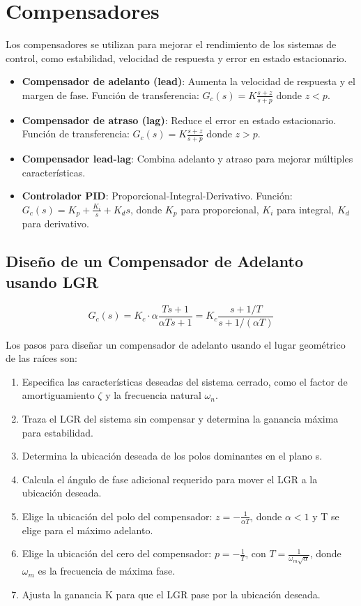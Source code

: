 \documentclass[legalpaper,twocolumn]{article}
\begin{document}
\section*{Compensadores}

Los compensadores se utilizan para mejorar el rendimiento de los sistemas de control, como estabilidad, velocidad de respuesta y error en estado estacionario.

\begin{itemize}
    \item \textbf{Compensador de adelanto (lead)}: Aumenta la velocidad de respuesta y el margen de fase. Función de transferencia: \( G_c(s) = K \frac{s + z}{s + p} \) donde \( z < p \).
    \item \textbf{Compensador de atraso (lag)}: Reduce el error en estado estacionario. Función de transferencia: \( G_c(s) = K \frac{s + z}{s + p} \) donde \( z > p \).
    \item \textbf{Compensador lead-lag}: Combina adelanto y atraso para mejorar múltiples características.
    \item \textbf{Controlador PID}: Proporcional-Integral-Derivativo. Función: \( G_c(s) = K_p + \frac{K_i}{s} + K_d s \), donde \( K_p \) para proporcional, \( K_i \) para integral, \( K_d \) para derivativo.
\end{itemize}

\subsection*{Diseño de un Compensador de Adelanto usando LGR}

\[
    G_c(s) = K_c \cdot \alpha \frac{T s + 1}{\alpha T s + 1} = K_c \frac{s + 1/T}{s + 1/(\alpha T)}
\]

Los pasos para diseñar un compensador de adelanto usando el lugar geométrico de las raíces son:

\begin{enumerate}
    \item Especifica las características deseadas del sistema cerrado, como el factor de amortiguamiento \(\zeta\) y la frecuencia natural \(\omega_n\).
    \item Traza el LGR del sistema sin compensar y determina la ganancia máxima para estabilidad.
    \item Determina la ubicación deseada de los polos dominantes en el plano s.
    \item Calcula el ángulo de fase adicional requerido para mover el LGR a la ubicación deseada.
    \item Elige la ubicación del polo del compensador: \( z = -\frac{1}{\alpha T} \), donde \(\alpha < 1\) y T se elige para el máximo adelanto.
    \item Elige la ubicación del cero del compensador: \( p = -\frac{1}{T} \), con \( T = \frac{1}{\omega_m \sqrt{\alpha}} \), donde \(\omega_m\) es la frecuencia de máxima fase.
    \item Ajusta la ganancia K para que el LGR pase por la ubicación deseada.
\end{enumerate}
\end{document}

